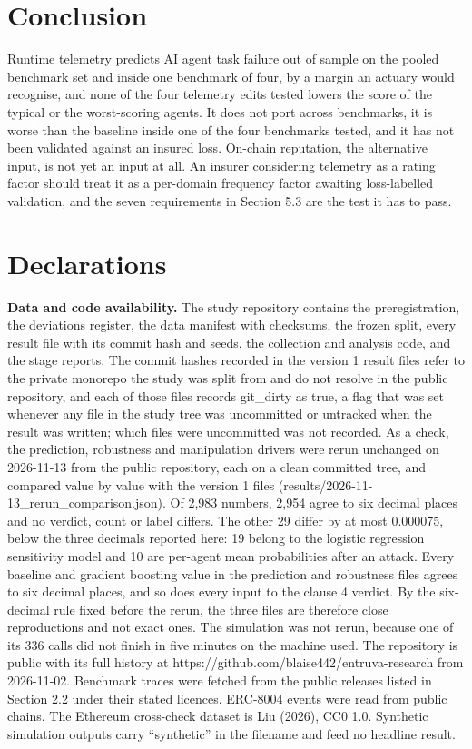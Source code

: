 \documentclass[
  11pt,
  a4paper,
]{article}
\begin{document}
\hypertarget{conclusion}{%
\section{Conclusion}\label{conclusion}}

Runtime telemetry predicts AI agent task failure out of sample on the
pooled benchmark set and inside one benchmark of four, by a margin an
actuary would recognise, and none of the four telemetry edits tested
lowers the score of the typical or the worst-scoring agents. It does not
port across benchmarks, it is worse than the baseline inside one of the
four benchmarks tested, and it has not been validated against an insured
loss. On-chain reputation, the alternative input, is not yet an input at
all. An insurer considering telemetry as a rating factor should treat it
as a per-domain frequency factor awaiting loss-labelled validation, and
the seven requirements in Section 5.3 are the test it has to pass.

\hypertarget{declarations}{%
\section*{Declarations}\label{declarations}}

\textbf{Data and code availability.} The study repository contains the
preregistration, the deviations register, the data manifest with
checksums, the frozen split, every result file with its commit hash and
seeds, the collection and analysis code, and the stage reports. The
commit hashes recorded in the version 1 result files refer to the
private monorepo the study was split from and do not resolve in the
public repository, and each of those files records git\_dirty as true, a
flag that was set whenever any file in the study tree was uncommitted or
untracked when the result was written; which files were uncommitted was
not recorded. As a check, the prediction, robustness and manipulation
drivers were rerun unchanged on 2026-11-13 from the public repository,
each on a clean committed tree, and compared value by value with the
version 1 files (results/2026-11-13\_rerun\_comparison.json). Of 2,983
numbers, 2,954 agree to six decimal places and no verdict, count or
label differs. The other 29 differ by at most 0.000075, below the three
decimals reported here: 19 belong to the logistic regression sensitivity
model and 10 are per-agent mean probabilities after an attack. Every
baseline and gradient boosting value in the prediction and robustness
files agrees to six decimal places, and so does every input to the
clause 4 verdict. By the six-decimal rule fixed before the rerun, the
three files are therefore close reproductions and not exact ones. The
simulation was not rerun, because one of its 336 calls did not finish in
five minutes on the machine used. The repository is public with its full
history at https://github.com/blaise442/entruva-research from
2026-11-02. Benchmark traces were fetched from the public releases
listed in Section 2.2 under their stated licences. ERC-8004 events were
read from public chains. The Ethereum cross-check dataset is Liu (2026),
CC0 1.0. Synthetic simulation outputs carry ``synthetic'' in the
filename and feed no headline result.
\end{document}

